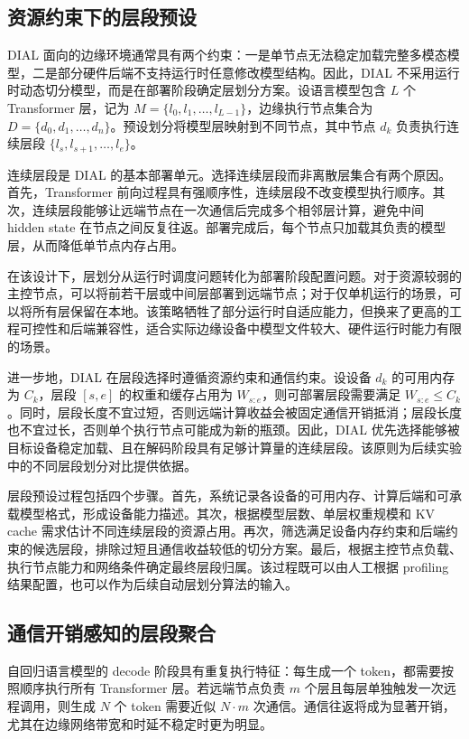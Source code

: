 \documentclass[10pt,a4paper,twocolumn]{ctexart}
\begin{document}
\subsection{资源约束下的层段预设}

DIAL 面向的边缘环境通常具有两个约束：一是单节点无法稳定加载完整多模态模型，二是部分硬件后端不支持运行时任意修改模型结构。因此，DIAL 不采用运行时动态切分模型，而是在部署阶段确定层划分方案。设语言模型包含 \(L\) 个 Transformer 层，记为 \(M=\{l_0,l_1,\ldots,l_{L-1}\}\)，边缘执行节点集合为 \(D=\{d_0,d_1,\ldots,d_n\}\)。预设划分将模型层映射到不同节点，其中节点 \(d_k\) 负责执行连续层段 \(\{l_s,l_{s+1},\ldots,l_e\}\)。

连续层段是 DIAL 的基本部署单元。选择连续层段而非离散层集合有两个原因。首先，Transformer 前向过程具有强顺序性，连续层段不改变模型执行顺序。其次，连续层段能够让远端节点在一次通信后完成多个相邻层计算，避免中间 hidden state 在节点之间反复往返。部署完成后，每个节点只加载其负责的模型层，从而降低单节点内存占用。

在该设计下，层划分从运行时调度问题转化为部署阶段配置问题。对于资源较弱的主控节点，可以将前若干层或中间层部署到远端节点；对于仅单机运行的场景，可以将所有层保留在本地。该策略牺牲了部分运行时自适应能力，但换来了更高的工程可控性和后端兼容性，适合实际边缘设备中模型文件较大、硬件运行时能力有限的场景。

进一步地，DIAL 在层段选择时遵循资源约束和通信约束。设设备 \(d_k\) 的可用内存为 \(C_k\)，层段 \([s,e]\) 的权重和缓存占用为 \(W_{s:e}\)，则可部署层段需要满足 \(W_{s:e}\le C_k\)。同时，层段长度不宜过短，否则远端计算收益会被固定通信开销抵消；层段长度也不宜过长，否则单个执行节点可能成为新的瓶颈。因此，DIAL 优先选择能够被目标设备稳定加载、且在解码阶段具有足够计算量的连续层段。该原则为后续实验中的不同层段划分对比提供依据。

层段预设过程包括四个步骤。首先，系统记录各设备的可用内存、计算后端和可承载模型格式，形成设备能力描述。其次，根据模型层数、单层权重规模和 KV cache 需求估计不同连续层段的资源占用。再次，筛选满足设备内存约束和后端约束的候选层段，排除过短且通信收益较低的切分方案。最后，根据主控节点负载、执行节点能力和网络条件确定最终层段归属。该过程既可以由人工根据 profiling 结果配置，也可以作为后续自动层划分算法的输入。

\subsection{通信开销感知的层段聚合}

自回归语言模型的 decode 阶段具有重复执行特征：每生成一个 token，都需要按照顺序执行所有 Transformer 层。若远端节点负责 \(m\) 个层且每层单独触发一次远程调用，则生成 \(N\) 个 token 需要近似 \(N\cdot m\) 次通信。通信往返将成为显著开销，尤其在边缘网络带宽和时延不稳定时更为明显。
\end{document}
